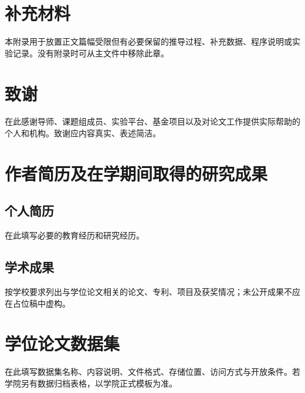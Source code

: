 \chapter{补充材料}

本附录用于放置正文篇幅受限但有必要保留的推导过程、补充数据、程序说明或实验记录。没有附录时可从主文件中移除此章。

\backmatter
\chapter{致谢}

在此感谢导师、课题组成员、实验平台、基金项目以及对论文工作提供实际帮助的个人和机构。致谢应内容真实、表述简洁。

\chapter{作者简历及在学期间取得的研究成果}

\section*{个人简历}
在此填写必要的教育经历和研究经历。

\section*{学术成果}
按学校要求列出与学位论文相关的论文、专利、项目及获奖情况；未公开成果不应在占位稿中虚构。

\chapter{学位论文数据集}

在此填写数据集名称、内容说明、文件格式、存储位置、访问方式与开放条件。若学院另有数据归档表格，以学院正式模板为准。
